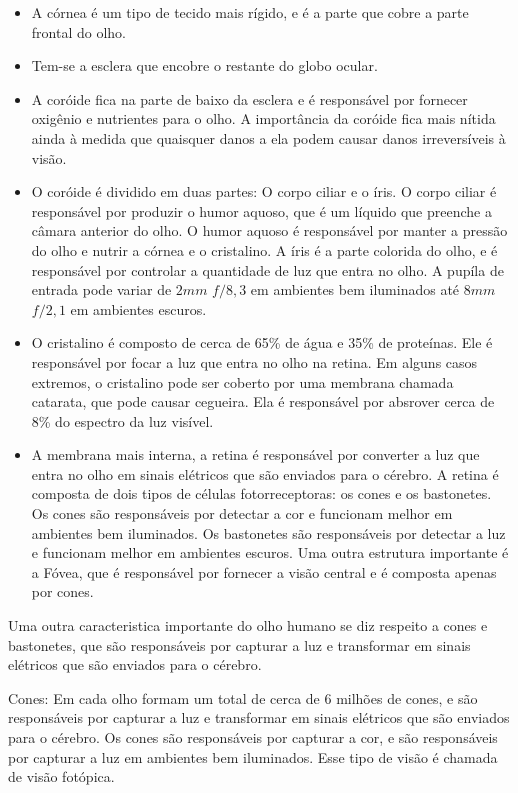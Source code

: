 \documentclass[12pt]{article}
\begin{document}
\begin{itemize}
    \item A córnea é um tipo de tecido mais rígido, e é a parte que cobre a parte frontal do olho.
    \item Tem-se a esclera que encobre o restante do globo ocular.
    \item A coróide fica na parte de baixo da esclera e é responsável por fornecer oxigênio e nutrientes
    para o olho. A importância da coróide fica mais nítida ainda à medida que quaisquer danos
    a ela podem causar danos irreversíveis à visão.
    \item O coróide é dividido em duas partes: O corpo ciliar e o íris. O corpo ciliar é responsável
por produzir o humor aquoso, que é um líquido que preenche a câmara anterior do olho. O humor
    aquoso é responsável por manter a pressão do olho e nutrir a córnea e o cristalino. A íris é a
    parte colorida do olho, e é responsável por controlar a quantidade de luz que entra no olho.
    A pupíla de entrada pode variar de $2mm$ $f/8,3$ em ambientes bem iluminados até $8mm$ $f/2,1$ em
    ambientes escuros.
    \item O cristalino é composto de cerca de 65\% de água e 35\% de proteínas. Ele é responsável por
    focar a luz que entra no olho na retina. Em alguns casos extremos, o cristalino pode ser
    coberto por uma membrana chamada catarata, que pode causar cegueira. Ela é responsável por absrover
    cerca de 8\% do espectro da luz visível.
    \item A membrana mais interna, a retina é responsável por converter a luz que entra no olho em
    sinais elétricos que são enviados para o cérebro. A retina é composta de dois tipos de células
    fotorreceptoras: os cones e os bastonetes. Os cones são responsáveis por detectar a cor e
    funcionam melhor em ambientes bem iluminados. Os bastonetes são responsáveis por detectar a
    luz e funcionam melhor em ambientes escuros. Uma outra estrutura importante é a Fóvea, que é
    responsável por fornecer a visão central e é composta apenas por cones.
\end{itemize}
    Uma outra caracteristica importante do olho humano se diz respeito a cones e bastonetes, que são
    responsáveis por capturar a luz e transformar em sinais elétricos que são enviados para o cérebro.

    Cones: Em cada olho formam um total de cerca de 6 milhões de cones, e são responsáveis por capturar
    a luz e transformar em sinais elétricos que são enviados para o cérebro. Os cones são responsáveis
    por capturar a cor, e são responsáveis por capturar a luz em ambientes bem iluminados. Esse tipo
    de visão é chamada de visão fotópica.
\end{document}
